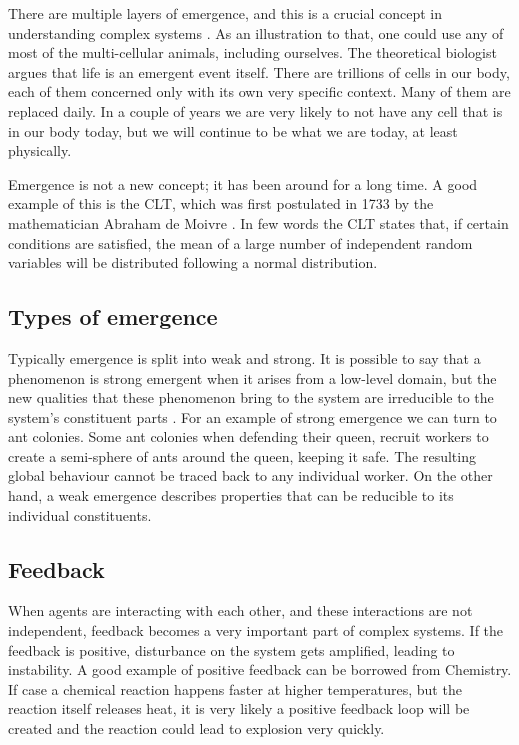 There are multiple layers of emergence, and this is a crucial concept in understanding complex systems \cite{miller2007complex}. As an illustration to that, one could use any of most of the multi-cellular animals, including ourselves. The theoretical biologist \citeauthor{life1010034} \cite{life1010034} argues that life is an emergent event itself. There are trillions of cells in our body, each of them concerned only with its own very specific context. Many of them are replaced daily. In a couple of years we are very likely to not have any cell that is in our body today, but we will continue to be what we are today, at least physically.

Emergence is not a new concept; it has been around for a long time. A good example of this is the \ac{CLT}, which was first postulated in 1733 by the mathematician Abraham de Moivre \cite{tijms2007understanding}. In few words the \ac{CLT} states that, if certain conditions are satisfied, the mean of a large number of independent random variables will be distributed following a normal distribution.

\subsection{Types of emergence}

Typically emergence is split into weak and strong. It is possible to say that a phenomenon is strong emergent when it arises from a low-level domain, but the new qualities that these phenomenon bring to the system are irreducible to the system's constituent parts \cite{laughlin2008different}. For an example of strong emergence we can turn to ant colonies. Some ant colonies when defending their queen, recruit workers to create a semi-sphere of ants around the queen, keeping it safe. The resulting global behaviour cannot be traced back to any individual worker. On the other hand, a weak emergence describes properties that can be reducible to its individual constituents. 

\subsection{Feedback}
\label{subsec:feedback}

When agents are interacting with each other, and these interactions are not independent, feedback becomes a very important part of complex systems. If the feedback is positive, disturbance on the system gets amplified, leading to instability. A good example of positive feedback can be borrowed from Chemistry. If case a chemical reaction happens faster at higher temperatures, but the reaction itself releases heat, it is very likely a positive feedback loop will be created and the reaction could lead to explosion very quickly.


